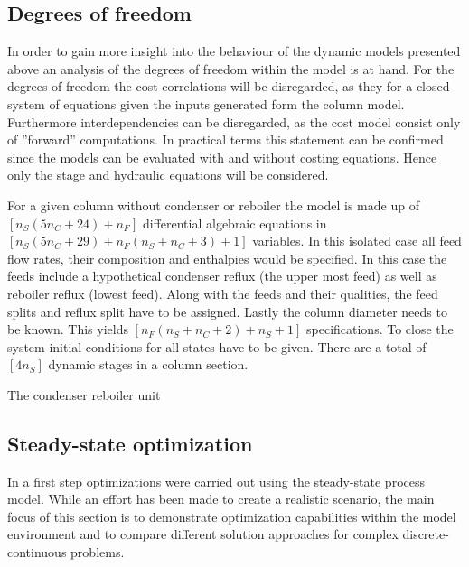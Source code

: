     \subsection{Degrees of freedom}
    In order to gain more insight into the behaviour of the dynamic models presented above an analysis
    of the degrees of freedom within the model is at hand. For the degrees of freedom the cost correlations
    will be disregarded, as they for a closed system of equations given the inputs generated form the column
    model. Furthermore interdependencies can be disregarded, as the cost model consist only of ''forward''
    computations. In practical terms this statement can be confirmed since the models can be evaluated
    with and without costing equations. Hence only the stage and hydraulic equations will be considered.

    For a given column without condenser or reboiler the model is made up of $[n_S (5n_C + 24) + n_F]$
    differential algebraic equations in $[n_S (5n_C + 29) + n_F (n_S + n_C + 3) + 1]$ variables. In this
    isolated case all feed flow rates, their composition and enthalpies would be specified. In this case
    the feeds include a hypothetical condenser reflux (the upper most feed) as well as reboiler reflux
    (lowest feed). Along with the feeds and their qualities, the feed splits and reflux split have to be
    assigned. Lastly the column diameter needs to be known. This yields $[n_F (n_S + n_C + 2) + n_S + 1]$
    specifications. To close the system initial conditions for all states have to be given. There
    are a total of $[4 n_S ]$ dynamic stages in a column section.

    The condenser reboiler unit

    \subsection{Steady-state optimization}
    In a first step optimizations were carried out using the steady-state process model. While an effort
    has been made to create a realistic scenario, the main focus of this section is to demonstrate
    optimization capabilities within the model environment \gproms and to compare different solution
    approaches for complex discrete-continuous problems.

